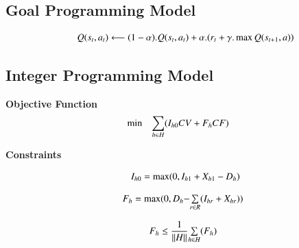 \documentclass{elsarticle}
\begin{document}
	\subsection{Goal Programming Model}


\begin{equation}
	\begin{array}{ll@{}ll}
	& \displaystyle Q(s_{t},a_{t}) \longleftarrow (1 - \alpha ).Q(s_{t},a_{t}) + \alpha .(r_{t} + \gamma . \max Q(s_{t+1},a))\\
	\end{array}
	\label{eq:Eq32}
	\end{equation}	
		



\subsection{Integer Programming Model}

		
	\textbf{Objective Function}
	\begin{equation}
	\begin{array}{ll@{}ll}
	\min & \displaystyle\sum\limits_{h \in H}&(I_{h0}CV + F_{h}CF)\\
	\end{array}
	\label{eq:Eq31}
	\end{equation}

	\textbf{Constraints}
	
	\begin{equation}
	\begin{array}{ll@{}ll}
	& \displaystyle I_{h0} = \max(0, I_{h1} + X_{h1} - D_{h})\\
	\end{array}
	\label{eq:Eq32}
	\end{equation}	
		
	\begin{equation}
	\begin{array}{ll@{}ll}
	& \displaystyle F_{h} = \max(0, D_{h} - &\sum\limits_{r \in R}(I_{hr} + X_{hr}))\\
	\end{array}
	\label{eq:Eq33}	
	\end{equation}
	
	\begin{equation}
	\begin{array}{ll@{}ll}
	& \displaystyle F_{h} \leq \frac{1}{\| H \|} &\sum\limits_{h \in H}(F_{h})\\
	\end{array}
	\label{eq:Eq33}	
	\end{equation}
	
\end{document}
